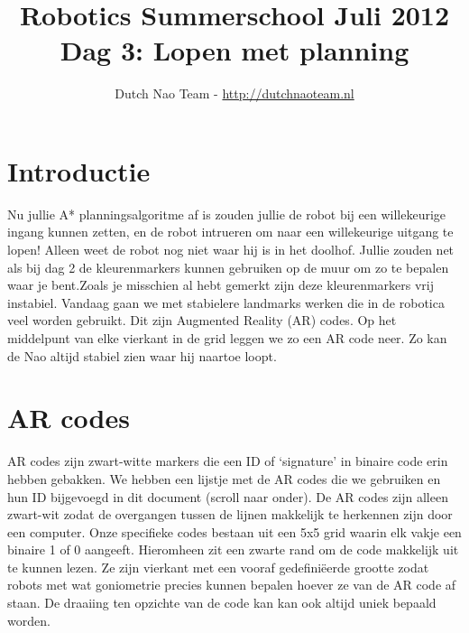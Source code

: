 \documentclass[a4paper]{article}
\title{\textbf{Robotics Summerschool Juli 2012} \\ Dag 3: Lopen met planning }
\author{Dutch Nao Team - \url{http://dutchnaoteam.nl}}
\date{}
\begin{document}
\maketitle

\section{Introductie}

Nu jullie A* planningsalgoritme af is zouden jullie de robot bij een willekeurige ingang kunnen zetten, en de robot intrueren om naar een willekeurige uitgang te lopen! Alleen weet de robot nog niet waar hij is in het doolhof. Jullie zouden net als bij dag 2 de kleurenmarkers kunnen gebruiken op de muur om zo te bepalen waar je bent.Zoals je misschien al hebt gemerkt zijn deze kleurenmarkers vrij instabiel. Vandaag gaan we met stabielere landmarks werken die in de robotica veel worden gebruikt. Dit zijn Augmented Reality (AR) codes. Op het middelpunt van elke vierkant in de grid leggen we zo een AR code neer. Zo kan de Nao altijd stabiel zien waar hij naartoe loopt.

\tableofcontents

\newpage

\section{AR codes}
AR codes zijn zwart-witte markers die een ID of `signature' in binaire code erin hebben gebakken. We hebben een lijstje met de AR codes die we gebruiken en hun ID bijgevoegd in dit document (scroll naar onder). De AR codes zijn alleen zwart-wit zodat de overgangen tussen de lijnen makkelijk te herkennen zijn door een computer. Onze specifieke codes bestaan uit een 5x5 grid waarin elk vakje een binaire 1 of 0 aangeeft. Hieromheen zit een zwarte rand om de code makkelijk uit te kunnen lezen. Ze zijn vierkant met een vooraf gedefini\"eerde grootte zodat robots met wat goniometrie precies kunnen bepalen hoever ze van de AR code af staan. De draaiing ten opzichte van de code kan kan ook altijd uniek bepaald worden.
\end{document}
